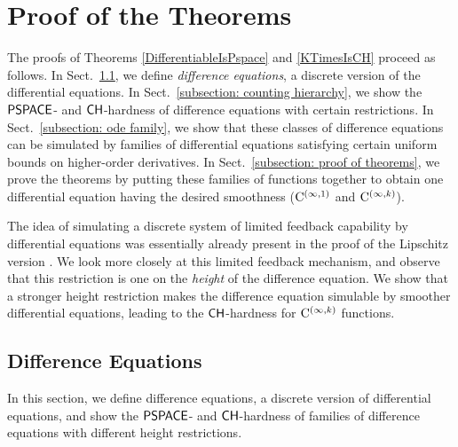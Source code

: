\section{Proof of the Theorems}
\label{section:differentiable}

The proofs of Theorems \ref{DifferentiableIsPspace} and \ref{KTimesIsCH}
proceed as follows. 
In Sect.~\ref{section:divp}, 
we define \emph{difference equations}, 
a discrete version of the differential equations. 
In Sect.~\ref{subsection: counting hierarchy}, 
we show the $\mathsf{PSPACE}$- and $\mathsf{CH}$-hardness of 
difference equations with certain restrictions. 
In Sect.~\ref{subsection: ode family}, 
we show that these classes of difference equations can be simulated
by families of differential equations 
satisfying certain uniform bounds on higher-order derivatives. 
In Sect.~\ref{subsection: proof of theorems}, 
we prove the theorems by
putting these families of functions together 
to obtain one differential equation 
having the desired smoothness 
($\mathrm C ^{(\infty, 1)}$ and $\mathrm C ^{(\infty, k)}$). 

The idea of simulating a discrete system of limited feedback capability
by differential equations
was essentially already present in the proof of 
the Lipschitz version \cite{kawamura2010lipschitz}. 
We look more closely at this limited feedback mechanism, 
and observe that this restriction is one on the \emph{height}
of the difference equation. 
We show that a stronger height restriction makes
the difference equation simulable by 
smoother differential equations, 
leading to the $\mathsf{CH}$-hardness for $\mathrm C ^{(\infty, k)}$ functions.

\subsection{Difference Equations}
\label{section:divp}

In this section, we define difference equations, 
a discrete version of differential equations,
and show the $\mathsf{PSPACE}$- and $\mathsf{CH}$-hardness of 
families of difference equations with different height restrictions. 

